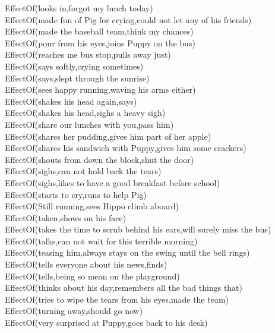 \begin{multicols}{2}
\begin{footnotesize}
EffectOf(looks in,forgot my lunch today) \\
EffectOf(made fun of Pig for crying,could not let any of his friends) \\
EffectOf(made the baseball team,think my chances) \\
EffectOf(pour from his eyes,joins Puppy on the bus) \\
EffectOf(reaches me bus stop,pulls away just) \\
EffectOf(says softly,crying sometimes) \\
EffectOf(says,slept through the sunrise) \\
EffectOf(sees happy running,waving his arms either) \\
EffectOf(shakes his head again,says) \\
EffectOf(shakes his head,sighs a heavy sigh) \\
EffectOf(share our lunches with you,pass him) \\
EffectOf(shares her pudding,gives him part of her apple) \\
EffectOf(shares his sandwich with Puppy,gives him some crackers) \\
EffectOf(shouts from down the block,shut the door) \\
EffectOf(sighs,can not hold back the tears) \\
EffectOf(sighs,likes to have a good breakfast before school) \\
EffectOf(starts to cry,runs to help Pig) \\
EffectOf(Still running,sees Hippo climb aboard) \\
EffectOf(taken,shows on his face) \\
EffectOf(takes the time to scrub behind his ears,will surely miss the bus) \\
EffectOf(talks,can not wait for this terrible morning) \\
EffectOf(teasing him,always stays on the swing until the bell rings) \\
EffectOf(tells everyone about his news,finds) \\
EffectOf(tells,being so mean on the playground) \\
EffectOf(thinks about his day,remembers all the bad things that) \\
EffectOf(tries to wipe the tears from his eyes,made the team) \\
EffectOf(turning away,should go now) \\
EffectOf(very surprised at Puppy,goes back to his desk) \\

\end{footnotesize}
\end{multicols}
